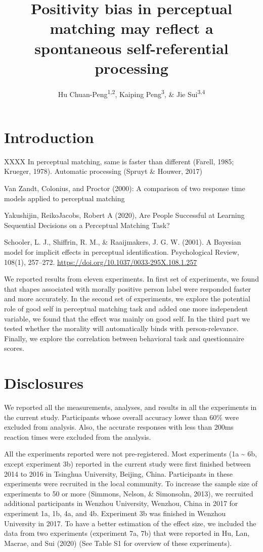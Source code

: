 \documentclass[
  english,
  man]{apa6}
\author{Hu Chuan-Peng\textsuperscript{1,2}, Kaiping Peng\textsuperscript{3}, \& Jie Sui\textsuperscript{3,4}}
\affiliation{
\vspace{0.5cm}
\textsuperscript{1} TBA\\\textsuperscript{2} Leibniz Institute for Resilience Research, 55131 Mainz, Germany\\\textsuperscript{3} Tsinghua University, 100084 Beijing, China\\\textsuperscript{4} University of Aberdeen, Aberdeen, Scotland}
\title{Positivity bias in perceptual matching may reflect a spontaneous self-referential processing}
\date{}
\begin{document}
\maketitle

\hypertarget{introduction}{%
\section{Introduction}\label{introduction}}

XXXX
In perceptual matching, same is faster than different (Farell, 1985; Krueger, 1978).
Automatic processing (Spruyt \& Houwer, 2017)

Van Zandt, Colonius, and Proctor (2000): A comparison of two response time models applied to perceptual matching

Yakushijin, ReikoJacobs, Robert A (2020), Are People Successful at Learning Sequential Decisions on a Perceptual Matching Task?

Schooler, L. J., Shiffrin, R. M., \& Raaijmakers, J. G. W. (2001). A Bayesian model for implicit effects in perceptual identification. Psychological Review, 108(1), 257--272. \url{https://doi.org/10.1037/0033-295X.108.1.257}

We reported results from eleven experiments. In first set of experiments, we found that shapes associated with morally positive person label were responded faster and more accurately. In the second set of experiments, we explore the potential role of good self in perceptual matching task and added one more independent variable, we found that the effect was mainly on good self. In the third part we tested whether the morality will automatically binds with person-relevance. Finally, we explore the correlation between behavioral task and questionnaire scores.

\hypertarget{disclosures}{%
\section{Disclosures}\label{disclosures}}

We reported all the measurements, analyses, and results in all the experiments in the current study. Participants whose overall accuracy lower than 60\% were excluded from analysis. Also, the accurate responses with less than 200ms reaction times were excluded from the analysis.

All the experiments reported were not pre-registered. Most experiments (1a \textasciitilde{} 6b, except experiment 3b) reported in the current study were first finished between 2014 to 2016 in Tsinghua University, Beijing, China. Participants in these experiments were recruited in the local community. To increase the sample size of experiments to 50 or more (Simmons, Nelson, \& Simonsohn, 2013), we recruited additional participants in Wenzhou University, Wenzhou, China in 2017 for experiment 1a, 1b, 4a, and 4b. Experiment 3b was finished in Wenzhou University in 2017. To have a better estimation of the effect size, we included the data from two experiments (experiment 7a, 7b) that were reported in Hu, Lan, Macrae, and Sui (2020) (See Table S1 for overview of these experiments).
\end{document}
